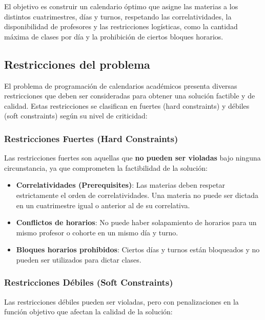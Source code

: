 El objetivo es construir un calendario óptimo que asigne las materias a los distintos cuatrimestres, días y turnos, respetando las correlatividades, la disponibilidad de profesores y las restricciones logísticas, como la cantidad máxima de clases por día y la prohibición de ciertos bloques horarios.

\subsection{Restricciones del problema}
El problema de programación de calendarios académicos presenta diversas restricciones que deben ser consideradas para obtener una solución factible y de calidad. Estas restricciones se clasifican en fuertes (hard constraints) y débiles (soft constraints) según su nivel de criticidad:

\subsubsection{Restricciones Fuertes (Hard Constraints)}
Las restricciones fuertes son aquellas que \textbf{no pueden ser violadas} bajo ninguna circunstancia, ya que comprometen la factibilidad de la solución:

\begin{itemize}
    \item \textbf{Correlatividades (Prerequisites)}: Las materias deben respetar estrictamente el orden de correlatividades. Una materia no puede ser dictada en un cuatrimestre igual o anterior al de su correlativa.
    \item \textbf{Conflictos de horarios}: No puede haber solapamiento de horarios para un mismo profesor o cohorte en un mismo día y turno.
    \item \textbf{Bloques horarios prohibidos}: Ciertos días y turnos están bloqueados y no pueden ser utilizados para dictar clases.
\end{itemize}

\subsubsection{Restricciones Débiles (Soft Constraints)}
Las restricciones débiles pueden ser violadas, pero con penalizaciones en la función objetivo que afectan la calidad de la solución:

